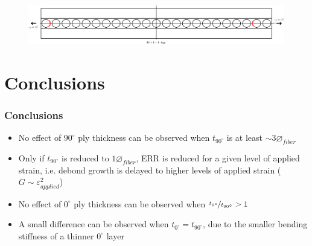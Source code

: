 \documentclass[first,firstsupp,lastsupp,last,hyperref,table]{ETHclass}
\begin{document}
\begin{frame}
\begin{columns}[c]
\begin{column}{0.5\textwidth}
\begin{figure}
\end{figure}
\end{column}
\end{columns}
\begin{figure}
\centering
\includegraphics[width=\textwidth]{twofibers-sameside-crackshielding21-thin.pdf}
\end{figure}
\end{frame}

\section{Conclusions}

\begin{frame}
\frametitle{Conclusions}
\vspace{-0.5cm}
\centering
\begin{itemize}[label=]
\item No effect of  $90^{\circ}$ ply thickness can be observed when $t_{90^{\circ}}$ is at least $\sim3\diameter_{fiber}$
\item Only if $t_{90^{\circ}}$ is reduced to $1\diameter_{fiber}$, ERR is reduced for a given level of applied strain, i.e. debond growth is delayed to higher levels of applied strain ($G\sim\varepsilon_{applied}^{2}$)
\item No effect of  $0^{\circ}$ ply thickness can be observed when $\nicefrac{t_{0^{\circ}}}{t_{90^{\circ}}}>1$
\item A small difference can be observed when  $t_{0^{\circ}}=t_{90^{\circ}}$, due to the smaller bending stiffness of a thinner $0^{\circ}$ layer
\end{itemize}
\end{frame}

\begin{frame}[plain]
\frametitle{}
\end{frame}
\end{document}
